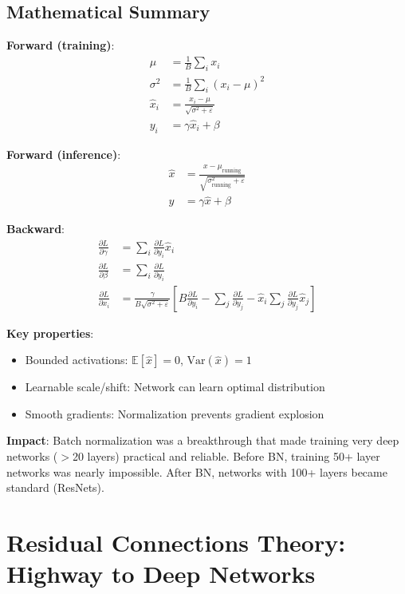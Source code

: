 \documentclass[11pt,oneside]{book}
\begin{document}
\subsection{Mathematical Summary}

\textbf{Forward (training)}:
\begin{align*}
\mu &= \frac{1}{B} \sum_i x_i \\
\sigma^2 &= \frac{1}{B} \sum_i (x_i - \mu)^2 \\
\hat{x}_i &= \frac{x_i - \mu}{\sqrt{\sigma^2 + \varepsilon}} \\
y_i &= \gamma \hat{x}_i + \beta
\end{align*}

\textbf{Forward (inference)}:
\begin{align*}
\hat{x} &= \frac{x - \mu_{\text{running}}}{\sqrt{\sigma^2_{\text{running}} + \varepsilon}} \\
y &= \gamma \hat{x} + \beta
\end{align*}

\textbf{Backward}:
\begin{align*}
\frac{\partial L}{\partial \gamma} &= \sum_i \frac{\partial L}{\partial y_i} \hat{x}_i \\
\frac{\partial L}{\partial \beta} &= \sum_i \frac{\partial L}{\partial y_i} \\
\frac{\partial L}{\partial x_i} &= \frac{\gamma}{B\sqrt{\sigma^2 + \varepsilon}} \left[B\frac{\partial L}{\partial y_i} - \sum_j\frac{\partial L}{\partial y_j} - \hat{x}_i\sum_j\frac{\partial L}{\partial y_j}\hat{x}_j\right]
\end{align*}

\textbf{Key properties}:
\begin{itemize}
\item Bounded activations: $\mathbb{E}[\hat{x}] = 0$, $\text{Var}(\hat{x}) = 1$
\item Learnable scale/shift: Network can learn optimal distribution
\item Smooth gradients: Normalization prevents gradient explosion
\end{itemize}

\textbf{Impact}: Batch normalization was a breakthrough that made training very deep networks ($>$20 layers) practical and reliable. Before BN, training 50+ layer networks was nearly impossible. After BN, networks with 100+ layers became standard (ResNets).

\section{Residual Connections Theory: Highway to Deep Networks}
\end{document}
